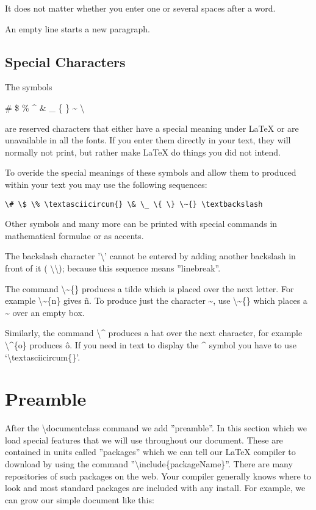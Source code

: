 \vspace*{2ex}
\vspace*{2ex}

It does not matter whether you enter one or several spaces after a word.

An empty line starts a new paragraph.

\pagebreak
\subsection{Special Characters}
The symbols 

\# \$ \% \textasciicircum{} \& \_ \{ \} \~{} \textbackslash

are reserved characters that either have a special meaning under LaTeX or are unavailable in all the fonts. If you enter them directly in your text, they will normally not print, but rather make LaTeX do things you did not intend.

To overide the special meanings of these symbols and allow them to produced within your text you may use the following sequences:
\begin{verbatim}
\# \$ \% \textasciicircum{} \& \_ \{ \} \~{} \textbackslash
\end{verbatim}

Other symbols and many more can be printed with special commands in mathematical formulae or as accents.

The backslash character '\textbackslash' cannot be entered by adding another backslash in front of it ( \textbackslash\textbackslash); because this sequence means ''linebreak''.

The command \textbackslash\~{}\{\} produces a tilde which is placed over the next letter. For example \textbackslash\~{}\{n\} gives \~{n}. To produce just the character \~{}, use \textbackslash\~{}\{\} which places a \~{} over an empty box.

Similarly, the command \textbackslash\textasciicircum{} produces a hat over the next character, for example \textbackslash\textasciicircum\{o\} produces \^{o}. If you need in text to display the \textasciicircum{} symbol you have to use `{\textbackslash}textasciicircum\{\}'.

\pagebreak
\section{Preamble}
After the {\textbackslash}documentclass command we add ''preamble''. In this section which we load special features that we will use throughout our document. These are contained in units called ''packages'' which we can tell our LaTeX compiler to download by using the command ''{\textbackslash}include\{packageName\}''. There are many repositories of such packages on the web. Your compiler generally knows where to look and most standard packages are included with any install. For example, we can grow our simple document like this:

